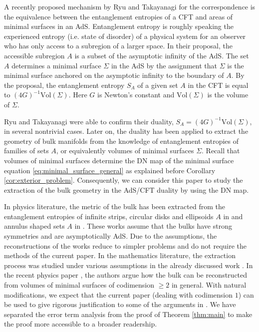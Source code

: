 \documentclass[12pt]{amsart}
\theoremstyle{definition}
\theoremstyle{remark}
\begin{document}
A recently proposed mechanism by Ryu and Takayanagi \cite{PhysRevLett.96.181602, ryu2006aspects} for the correspondence is the equivalence between the entanglement entropies of a CFT and areas of minimal surfaces in an AdS. Entanglement entropy is roughly speaking the experienced entropy (i.e. state of disorder) of a physical system for an observer who has only access to a subregion of a larger space. 
In their proposal, the accessible subregion $A$ is a subset of the asymptotic infinity of the AdS.  The set $A$ determines a minimal surface $\Sigma$ in the AdS by the assignment that $\Sigma$ is the minimal surface anchored on the asymptotic infinity to the boundary of $A$. By the proposal, the entanglement entropy $S_A$ of a given set $A$ in the CFT is equal to $(4G)^{-1}\text{Vol}(\Sigma)$. Here $G$ is Newton's constant and $\text{Vol}(\Sigma)$ is the volume of $\Sigma$.

Ryu and Takayanagi were able to confirm their duality, $S_A=(4G)^{-1}\text{Vol}(\Sigma)$, in several nontrivial cases. Later on, the duality has been applied to extract the geometry of bulk manifolds from the knowledge of entanglement entropies of families of sets $A$, or equivalently volumes of minimal surfaces $\Sigma$. Recall that volumes of minimal surfaces determine the DN map of the minimal surface equation \eqref{eq:minimal_surface_general} as explained before Corollary \ref{cor:exterior_problem}. Consequently, we can consider this paper to study the extraction of the bulk geometry in the AdS/CFT duality by using the DN map.

In physics literature, the metric of the bulk has been extracted from the entanglement entropies of infinite strips, circular disks and ellipsoids $A$ in \cite{bilson2008extracting, bilson2011extracting,fonda2015shape, hubeny2012extremal, jokela2021towards} and annulus shaped sets $A$ in \cite{jokela2019notes}. These works assume that the bulks have strong symmetries and are asymptotically AdS. Due to the assumptions, the reconstructions of the works reduce to simpler problems and do not require the methods of the current paper. In the mathematics literature, the extraction process was studied under various assumptions in the already discussed work \cite{Tracey}. In the recent physics paper \cite{bao2019towards}, the authors argue how the bulk can be reconstructed from volumes of minimal surfaces of codimension $\geq 2$ in general. 
With natural modifications, we expect that the current paper (dealing with codimension $1$) can be used to give rigorous justification to some of the arguments in \cite{bao2019towards}. We have separated the error term analysis from the proof of Theorem \ref{thm:main} to make the proof more accessible to a broader readership.
\end{document}
